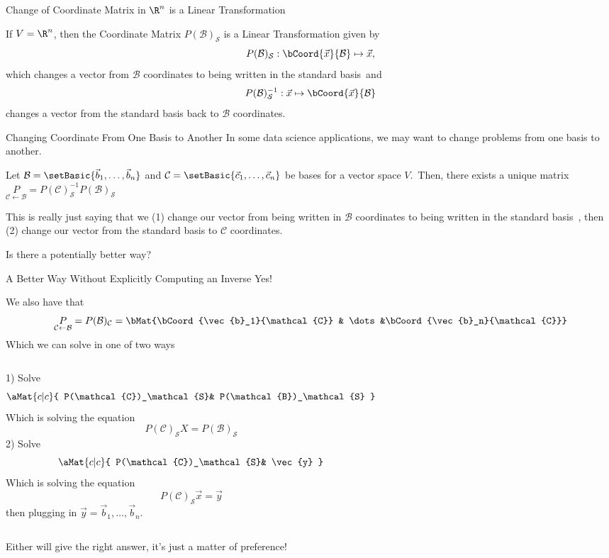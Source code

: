 \documentclass[xcoler=dvipsnames, aspectratio=169]{beamer}
\newcommand{\B}{\mathcal{B}}
\newcommand{\C}{\mathcal{C}}
\renewcommand{\S}{\mathcal{S}}
\begin{document}
    \begin{frame}{Change of Coordinate Matrix in $\R^n$ is a Linear Transformation}
        \begin{theorem}
            If $V=\R^n$, then the Coordinate Matrix $P(\B)_\S$ is a Linear Transformation given by
            \[
                P(\B)_\S:\bCoord{\vec{x}}{\B}\mapsto\vec{x},
            \]
            which changes a vector from $\B$ coordinates to being written in the standard basis\pause\
            and
            \[
                P(\B)^{-1}_\S:\vec{x}\mapsto\bCoord{\vec{x}}{\B}
            \]
            changes a vector from the standard basis back to $\B$ coordinates.
        \end{theorem}
    \end{frame}
    \begin{frame}{Changing Coordinate From One Basis to Another}
        In some data science applications, we may want to change problems from one basis to another.
        \pause
        \begin{theorem}
            Let $\B=\setBasic{\vec{b}_1, \dots, \vec{b}_n}$ and $\C=\setBasic{\vec{c}_1,\dots,\vec{c}_n}$
            be bases for a vector space $V$.\pause\ Then, there exists a unique matrix
            $\underset{\C\leftarrow\B}{P}=P(\C)^{-1}_\S P(\B)_\S$
        \end{theorem}\pause

        This is really just saying that we (1) change our vector from being written in $\B$ coordinates
        to being written in the standard basis\pause\ , then (2) change our vector from the standard
        basis to $\C$ coordinates.\pause\

        Is there a potentially better way?
    \end{frame}
    \begin{frame}{A Better Way Without Explicitly Computing an Inverse}
        Yes!\pause\

        We also have that
        \[
            \underset{\C\leftarrow\B}{P}=P(\B)_\C=\bMat{\bCoord{\vec{b}_1}{\C} & \dots &\bCoord{\vec{b}_n}{\C}}
        \]\pause
        Which we can solve in one of two ways
        \begin{columns}
                1) Solve
                \[
                    \aMat{c|c}{
                        P(\C)_\S & P(\B)_\S
                    }
                \]\pause
                Which is solving the equation
                \[
                    P(\C)_\S X = P(\B)_\S
                \]\pause
                2) Solve
                \[
                    \aMat{c|c}{
                        P(\C)_\S & \vec{y}
                    }
                \]\pause
                Which is solving the equation
                \[
                    P(\C)_\S\vec{x} = \vec{y}
                \]
                then plugging in $\vec{y} = \vec{b}_1,\dots,\vec{b}_n$.\pause
        \end{columns}
        Either will give the right answer, it's just a matter of preference!
    \end{frame}
\end{document}
